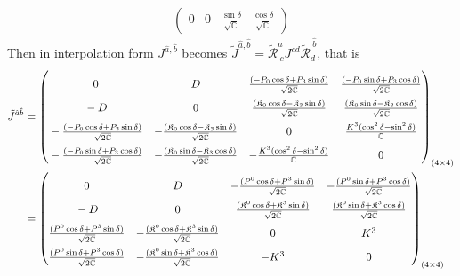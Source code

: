 \documentclass[]{article}
\numberwithin{equation}{section}
\begin{document}
{{\begin{align}
\begin{pmatrix}
    0&0&\frac{\sin{\delta}}{\sqrt{\mathbb{C}}}&\frac{\cos{\delta}}{\sqrt{\mathbb{C}}}
    \end{pmatrix}
\end{align}
Then in interpolation form $J^{\hat{a},\hat{b}}$ becomes $\tilde{J}^{\hat{a},\hat{b}}=\tilde{\mathcal{R}}^{\hat{a}}_{~{c}}J^{cd}\tilde{\mathcal{R}}^{~\hat{b}}_{{d}}$, that is
\begin{align}
    \tilde{J}^{{\hat{a}}{\hat{b}}}&=\begin{pmatrix}
    \rule{0pt}{16pt} 0&D&\frac{(-P_0\cos{\delta}+P_3\sin{\delta})}{\sqrt{2\mathbb{C}}}&\frac{(-{P}_{{0}}\sin{\delta}+{P}_{{3}}\cos{\delta})}{\sqrt{2\mathbb{C}}}\\
    \rule{0pt}{16pt} -D&0&\frac{(\mathfrak{K}_0\cos{\delta}-\mathfrak{K}_3\sin{\delta})}{\sqrt{2\mathbb{C}}}&\frac{(\mathfrak{K}_{{0}}\sin{\delta}-\mathfrak{K}_{{3}}\cos{\delta})}{\sqrt{2\mathbb{C}}}\\
    \rule{0pt}{16pt} -\frac{(-P_0\cos{\delta}+P_3\sin{\delta})}{\sqrt{2\mathbb{C}}}&-\frac{(\mathfrak{K}_0\cos{\delta}-\mathfrak{K}_3\sin{\delta})}{\sqrt{2\mathbb{C}}}&0  & \frac{K^{3}(\cos^{2}{\delta}-\sin^{2}{\delta})}{\mathbb{C}}\\
    \rule{0pt}{16pt} -\frac{(-{P}_{{0}}\sin{\delta}+{P}_{{3}}\cos{\delta})}{\sqrt{2\mathbb{C}}}&-\frac{(\mathfrak{K}_{{0}}\sin{\delta}-\mathfrak{K}_{{3}}\cos{\delta})}{\sqrt{2\mathbb{C}}}&-\frac{K^{3}(\cos^{2}{\delta}-\sin^{2}{\delta})}{\mathbb{C}}  & 0
  \end{pmatrix}_{(4\times4)}\\
  &=\begin{pmatrix}
    \rule{0pt}{16pt} 0&D&-\frac{(P^0\cos{\delta}+P^3\sin{\delta})}{\sqrt{2\mathbb{C}}}&-\frac{({P}^{{0}}\sin{\delta}+{P}^{{3}}\cos{\delta})}{\sqrt{2\mathbb{C}}}\\
    \rule{0pt}{16pt} -D&0&\frac{(\mathfrak{K}^0\cos{\delta}+\mathfrak{K}^3\sin{\delta})}{\sqrt{2\mathbb{C}}}&\frac{(\mathfrak{K}^{{0}}\sin{\delta}+\mathfrak{K}^{{3}}\cos{\delta})}{\sqrt{2\mathbb{C}}}\\
    \rule{0pt}{16pt} \frac{(P^0\cos{\delta}+P^3\sin{\delta})}{\sqrt{2\mathbb{C}}}&-\frac{(\mathfrak{K}^0\cos{\delta}+\mathfrak{K}^3\sin{\delta})}{\sqrt{2\mathbb{C}}}&0  & K^{3}\\
    \rule{0pt}{16pt} \frac{({P}^{{0}}\sin{\delta}+{P}^{{3}}\cos{\delta})}{\sqrt{2\mathbb{C}}}&-\frac{(\mathfrak{K}^{{0}}\sin{\delta}+\mathfrak{K}^{{3}}\cos{\delta})}{\sqrt{2\mathbb{C}}}&-K^{3}  & 0
  \end{pmatrix}_{(4\times4)}\\

\end{align}}}
\end{document}

